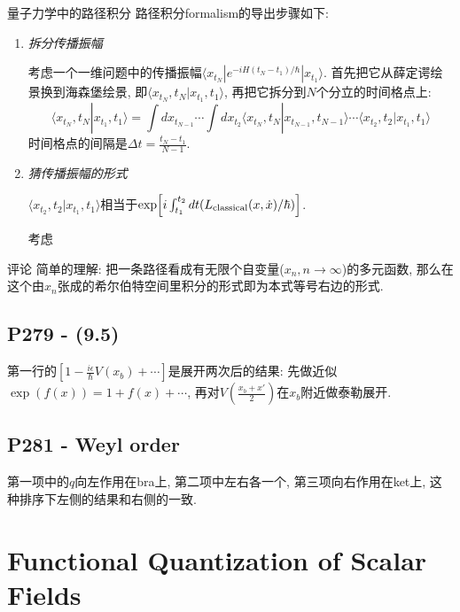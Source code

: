 \begin{mybox}{量子力学中的路径积分}
  路径积分formalism的导出步骤如下:
  \begin{enumerate}
    \item \textit{拆分传播振幅}

          考虑一个一维问题中的传播振幅$\langle x_{t_N}|e^{-iH(t_N-t_1)/\hbar}|x_{t_1} \rangle$.
          首先把它从薛定谔绘景换到海森堡绘景, 即$\langle x_{t_N}, t_N|x_{t_1}, t_1 \rangle$, 再把它拆分到$N$个分立的时间格点上:
          \begin{equation*}
            \langle x_{t_N}, t_N|x_{t_1}, t_1 \rangle = \int dx_{t_{N-1}} \cdots \int dx_{t_2} \langle x_{t_N}, t_N|x_{t_{N-1}}, t_{N-1} \rangle \cdots \langle x_{t_2}, t_2|x_{t_1}, t_1 \rangle
          \end{equation*}
          时间格点的间隔是$\Delta t = \frac{t_N-t_1}{N-1}$.
    \item \textit{猜传播振幅的形式}
    
    $\langle x_{t_2}, t_2|x_{t_1}, t_1 \rangle$相当于$\exp\Bigl[i\int_{t_1}^{t_2}dt (L_\text{classical}(x, \dot{x})/\hbar)\Bigr]$.
    
    考虑
  \end{enumerate}
\end{mybox}

\begin{mybox}{评论}
  简单的理解: 把一条路径看成有无限个自变量($x_n, n \rightarrow \infty$)的多元函数, 那么在这个由$x_n$张成的希尔伯特空间里积分的形式即为本式等号右边的形式.
\end{mybox}

\subsection{P279 - (9.5)}

第一行的$[1-\frac{i\epsilon}{\hbar}V(x_b)+\cdots]$是展开两次后的结果: 先做近似$\exp(f(x)) = 1 + f(x) + \cdots$, 再对$V(\frac{x_b + x'}{2})$在$x_b$附近做泰勒展开.

\subsection{P281 - Weyl order}

第一项中的$q$向左作用在bra上, 第二项中左右各一个, 第三项向右作用在ket上, 这种排序下左侧的结果和右侧的一致.

\section{Functional Quantization of Scalar Fields}

